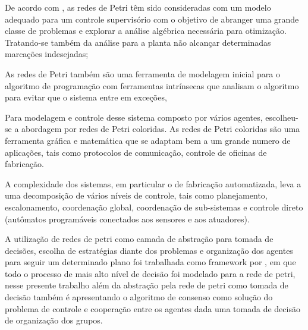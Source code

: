 De acordo com \cite{discrete}, as redes de Petri têm sido consideradas com um modelo adequado para um controle supervisório com o objetivo de abranger uma grande classe de problemas e explorar a análise algébrica necessária para otimização. Tratando-se também da análise para a planta não alcançar determinadas marcações indesejadas;

As redes de Petri também são uma ferramenta de modelagem inicial para o algoritmo de programação com ferramentas intrínsecas que analisam o algoritmo para evitar que o sistema entre em exceções,\cite{embeddedOO}

Para modelagem e controle desse sistema composto por vários agentes, escolheu-se a abordagem por redes de Petri coloridas. As redes de Petri  coloridas são uma ferramenta gráfica e matemática que se adaptam bem a um grande numero de aplicações, tais como protocolos de comunicação, controle de oficinas de fabricação. 

A complexidade dos sistemas, em particular o de fabricação automatizada, leva a uma decomposição de vários níveis de controle, tais como planejamento, escalonamento, coordenação global, coordenação de sub-sistemas e controle direto (autômatos programáveis conectados aos sensores e aos atuadores). \cite{vallete}

A utilização de redes de petri como camada de abstração para tomada de decisões, escolha de estratégias diante dos problemas e organização dos agentes para seguir um determinado plano foi trabalhada como framework por \cite{Ebadi2010}, em que todo o processo de mais alto nível de decisão foi modelado para a rede de petri, nesse presente trabalho além da abstração pela rede de petri como tomada de decisão também é apresentando o algoritmo de consenso como solução do problema de controle e cooperação entre os agentes dada uma tomada de decisão de organização dos grupos.






